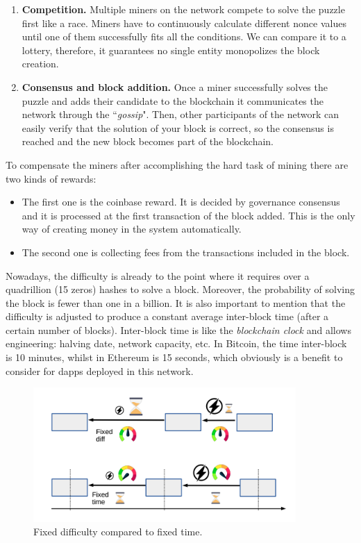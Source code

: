 \documentclass[a4paper,12pt]{article}
\begin{document}
\begin{appendices}
{\begin{enumerate}
    \item \textbf{Competition.} Multiple miners on the network compete to solve the puzzle first like a race. Miners have to continuously calculate different nonce values until one of them successfully fits all the conditions. We can compare it to a lottery, therefore, it guarantees no single entity monopolizes the block creation.
    \item \textbf{Consensus and block addition.} Once a miner successfully solves the puzzle and adds their candidate to the blockchain it communicates the network through the ``\textit{\Gls{gossip}}". Then, other participants of the network can easily verify that the solution of your block is correct, so the consensus is reached and the new block becomes part of the blockchain.
\end{enumerate}

{To compensate the miners after accomplishing the hard task of mining there are two kinds of rewards:}
\begin{itemize}
    \item The first one is the coinbase reward. It is decided by governance consensus and it is processed at the first transaction of the block added. This is the only way of creating money in the system automatically.
    \item The second one is collecting fees from the transactions included in the block.
\end{itemize}

Nowadays, the difficulty is already to the point where it requires over a quadrillion (15 zeros) hashes to solve a block. Moreover, the probability of solving the block is fewer than one in a billion. It is also important to mention that the difficulty is adjusted to produce a constant average inter-block time (after a certain number of blocks). Inter-block time is like the \textit{blockchain clock} and allows engineering: halving date, network capacity, etc. In Bitcoin, the time inter-block is 10 minutes, whilst in Ethereum is 15 seconds, which obviously is a benefit to consider for dapps deployed in this network.

\begin{figure}[H]
\centering
\includegraphics[width=10cm]{img/chapter_2/difficulty.png}
\caption[Fixed difficulty compared to fixed time]{\footnotesize{Fixed difficulty compared to fixed time.}}
\label{fig:difficulty_comparison}
\end{figure}

}
\end{appendices}
\end{document}
